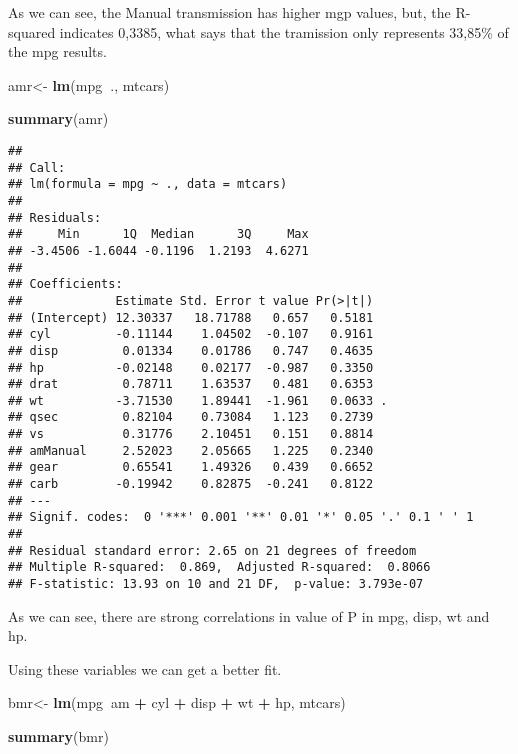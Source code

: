 \documentclass[]{article}
\newenvironment{Shaded}{\begin{snugshade}}{\end{snugshade}}
\newcommand{\KeywordTok}[1]{\textcolor[rgb]{0.13,0.29,0.53}{\textbf{#1}}}
\newcommand{\NormalTok}[1]{#1}
\newcommand{\OperatorTok}[1]{\textcolor[rgb]{0.81,0.36,0.00}{\textbf{#1}}}
\newcommand{\StringTok}[1]{\textcolor[rgb]{0.31,0.60,0.02}{#1}}
\begin{document}
As we can see, the Manual transmission has higher mgp values, but, the
R-squared indicates 0,3385, what says that the tramission only
represents 33,85\% of the mpg results.

\begin{Shaded}
\begin{Highlighting}[]
\NormalTok{amr<-}\StringTok{ }\KeywordTok{lm}\NormalTok{(mpg}\OperatorTok{~}\NormalTok{., mtcars)}

\KeywordTok{summary}\NormalTok{(amr)}
\end{Highlighting}
\end{Shaded}

\begin{verbatim}
## 
## Call:
## lm(formula = mpg ~ ., data = mtcars)
## 
## Residuals:
##     Min      1Q  Median      3Q     Max 
## -3.4506 -1.6044 -0.1196  1.2193  4.6271 
## 
## Coefficients:
##             Estimate Std. Error t value Pr(>|t|)  
## (Intercept) 12.30337   18.71788   0.657   0.5181  
## cyl         -0.11144    1.04502  -0.107   0.9161  
## disp         0.01334    0.01786   0.747   0.4635  
## hp          -0.02148    0.02177  -0.987   0.3350  
## drat         0.78711    1.63537   0.481   0.6353  
## wt          -3.71530    1.89441  -1.961   0.0633 .
## qsec         0.82104    0.73084   1.123   0.2739  
## vs           0.31776    2.10451   0.151   0.8814  
## amManual     2.52023    2.05665   1.225   0.2340  
## gear         0.65541    1.49326   0.439   0.6652  
## carb        -0.19942    0.82875  -0.241   0.8122  
## ---
## Signif. codes:  0 '***' 0.001 '**' 0.01 '*' 0.05 '.' 0.1 ' ' 1
## 
## Residual standard error: 2.65 on 21 degrees of freedom
## Multiple R-squared:  0.869,  Adjusted R-squared:  0.8066 
## F-statistic: 13.93 on 10 and 21 DF,  p-value: 3.793e-07
\end{verbatim}

As we can see, there are strong correlations in value of P in mpg, disp,
wt and hp.

Using these variables we can get a better fit.

\begin{Shaded}
\begin{Highlighting}[]
\NormalTok{bmr<-}\StringTok{ }\KeywordTok{lm}\NormalTok{(mpg}\OperatorTok{~}\NormalTok{am }\OperatorTok{+}\StringTok{ }\NormalTok{cyl }\OperatorTok{+}\StringTok{ }\NormalTok{disp }\OperatorTok{+}\StringTok{ }\NormalTok{wt }\OperatorTok{+}\StringTok{ }\NormalTok{hp, mtcars)}

\KeywordTok{summary}\NormalTok{(bmr)}
\end{Highlighting}
\end{Shaded}
\end{document}
